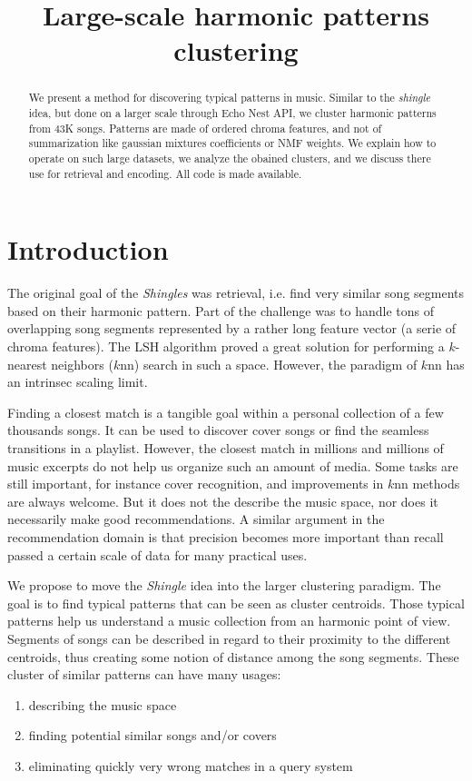 \documentclass{article}
\title{Large-scale harmonic patterns clustering}
\begin{document}
%
\maketitle
%
\begin{abstract}
We present a method for discovering typical patterns in music.
Similar to the \textit{shingle} idea, but done on a larger scale through
Echo Nest API, we cluster harmonic patterns from 43K songs. Patterns are
made of ordered chroma features, and not of summarization like gaussian
mixtures coefficients or NMF weights. We explain
how to operate on such large datasets, we analyze the obained clusters,
and we discuss there use for retrieval and encoding. All code is made
available.
\end{abstract}
%
\section{Introduction}\label{sec:introduction}

The original goal of the \textit{Shingles} was retrieval, i.e. find very
similar song segments based on their harmonic pattern. Part of the
challenge was to handle tons of overlapping song segments represented
by a rather long feature vector (a serie of chroma features).
The LSH algorithm proved a great solution for performing a $k$-nearest
neighbors ($k$nn) search in such a space. However, the paradigm of $k$nn has
an intrinsec scaling limit.

Finding a closest match is a tangible goal within a personal collection
of a few thousands songs. It can be used to discover cover songs or
find the seamless transitions in a playlist. However, the closest match
in millions and millions of music excerpts do not help us organize such
an amount of media. Some tasks are still important, for instance cover
recognition, and improvements in $k$nn methods are always welcome.
But it does not the describe the music space, nor does it necessarily
make good recommendations. A similar argument in the recommendation
domain is that precision becomes more important than recall passed a certain
scale of data for many practical uses.

We propose to move the \textit{Shingle} idea into the larger clustering paradigm.
The goal is to find typical patterns that can be seen as cluster centroids.
Those typical patterns help us understand a music collection from an
harmonic point of view. Segments of songs can be described in regard to their
proximity to the different centroids, thus creating some notion of distance
among the song segments. These cluster of similar patterns can have many usages:
\begin{enumerate}
\item describing the music space
\item finding potential similar songs and/or covers
\item eliminating quickly very wrong matches in a query system
\end{enumerate}
\end{document}
